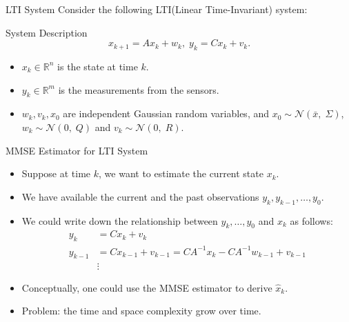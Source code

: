 \documentclass[10pt]{beamer}
\begin{document}
\begin{frame}{LTI System}
  Consider the following LTI(Linear Time-Invariant) system:
  \begin{block}{System Description}
      \begin{displaymath}
	x_{k+1} = Ax_k +  w_k,\; y_{k} = C x_k + v_k.
      \end{displaymath}
    \end{block}
    \begin{itemize}
      \item $x_k \in \mathbb R^n$ is the state at time $k$.
      \item  $y_k \in \mathbb R^m$ is the measurements from the sensors. 
      \item $w_k,v_k,x_0$ are independent Gaussian random variables, and $x_0 \sim \mathcal N(\bar x,\;\Sigma)$, $w_k \sim \mathcal N(0,\;Q)$ and $v_k \sim \mathcal N(0,\;R)$. 
    \end{itemize}
  \end{frame}

  \begin{frame}{MMSE Estimator for LTI System}
    \begin{itemize}
      \item Suppose at time $k$, we want to estimate the current state $x_k$.
      \item We have available the current and the past observations $y_k,y_{k-1},\dots,y_0$.
      \item We could write down the relationship between $y_k,\dots,y_0$ and $x_k$ as follows:
	\begin{displaymath}
	  \begin{split}
	    y_k& = C x_k + v_k \\
	    y_{k-1} & = Cx_{k-1}+v_{k-1} = CA^{-1}x_k -C A^{-1}w_{k-1} + v_{k-1}\\
	    &\vdots
	  \end{split}
	\end{displaymath}
      \item Conceptually, one could use the MMSE estimator to derive $\hat x_k$.
      \item Problem: the time and space complexity grow over time.
    \end{itemize}
  \end{frame}
\end{document}
